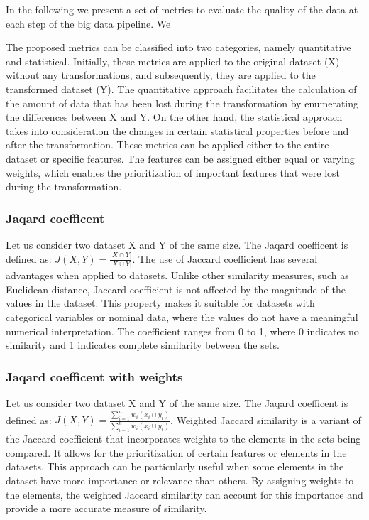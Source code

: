 In the following we present a set of metrics to evaluate the quality of the data at each step of the big data pipeline.
We

The proposed metrics can be classified into two categories, namely quantitative and statistical.
Initially, these metrics are applied to the original dataset (X) without any transformations, and subsequently, they are applied to the transformed dataset (Y).
The quantitative approach facilitates the calculation of the amount of data that has been lost during the transformation by enumerating the differences between X and Y.
On the other hand, the statistical approach takes into consideration the changes in certain statistical properties before and after the transformation.
These metrics can be applied either to the entire dataset or specific features.
The features can be assigned either equal or varying weights, which enables the prioritization of important features that were lost during the transformation.


\subsubsection{Jaqard coefficent}
Let us consider two dataset X and Y of the same size.
The Jaqard coefficent is defined as: $J(X,Y) = \frac{|X \cap Y|}{|X \cup Y|}$.
The use of Jaccard coefficient has several advantages when applied to datasets.
Unlike other similarity measures, such as Euclidean distance, Jaccard coefficient is not affected by the magnitude of the values in the dataset.
This property makes it suitable for datasets with categorical variables or nominal data, where the values do not have a meaningful numerical interpretation.
The coefficient ranges from 0 to 1, where 0 indicates no similarity and 1 indicates complete similarity between the sets.
\subsubsection{Jaqard coefficent with weights} Let us consider two dataset X and Y of the same size. The Jaqard coefficent is defined as: $J(X,Y) = \frac{\sum_{i=1}^{n}w_i(x_i \cap y_i)}{\sum_{i=1}^{n}w_i(x_i \cup y_i)}$.
Weighted Jaccard similarity is a variant of the Jaccard coefficient that incorporates weights to the elements in the sets being compared.
It allows for the prioritization of certain features or elements in the datasets.
This approach can be particularly useful when some elements in the dataset have more importance or relevance than others.
By assigning weights to the elements, the weighted Jaccard similarity can account for this importance and provide a more accurate measure of similarity.
